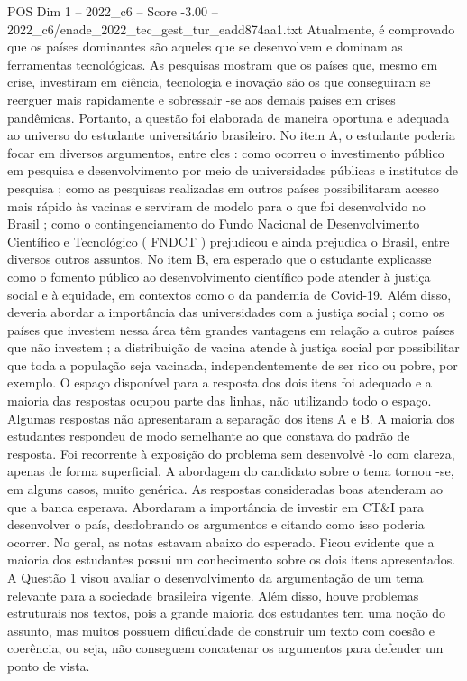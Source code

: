 \begin{textsample}{POS Dim 1 – 2022\_c6 – Score -3.00 – 2022\_c6/enade\_2022\_tec\_gest\_tur\_eadd874aa1.txt}
Atualmente, é comprovado que os países dominantes são aqueles que se desenvolvem e dominam as ferramentas tecnológicas.
As pesquisas mostram que os países que, mesmo em crise, investiram em ciência, tecnologia e inovação são os que conseguiram se reerguer mais rapidamente e sobressair -se aos demais países em crises pandêmicas.
Portanto, a questão foi elaborada de maneira oportuna e adequada ao universo do estudante universitário brasileiro.
No item A, o estudante poderia focar em diversos argumentos, entre eles : como ocorreu o investimento público em pesquisa e desenvolvimento por meio de universidades públicas e institutos de pesquisa ; como as pesquisas realizadas em outros países possibilitaram acesso mais rápido às vacinas e serviram de modelo para o que foi desenvolvido no Brasil ; como o contingenciamento do Fundo Nacional de Desenvolvimento Científico e Tecnológico ( FNDCT ) prejudicou e ainda prejudica o Brasil, entre diversos outros assuntos.
No item B, era esperado que o estudante explicasse como o fomento público ao desenvolvimento científico pode atender à justiça social e à equidade, em contextos como o da pandemia de Covid-19.
Além disso, deveria abordar a importância das universidades com a justiça social ; como os países que investem nessa área têm grandes vantagens em relação a outros países que não investem ; a distribuição de vacina atende à justiça social por possibilitar que toda a população seja vacinada, independentemente de ser rico ou pobre, por exemplo.
O espaço disponível para a resposta dos dois itens foi adequado e a maioria das respostas ocupou parte das linhas, não utilizando todo o espaço.
Algumas respostas não apresentaram a separação dos itens A e B.
A maioria dos estudantes respondeu de modo semelhante ao que constava do padrão de resposta.
Foi recorrente à exposição do problema sem desenvolvê -lo com clareza, apenas de forma superficial.
A abordagem do candidato sobre o tema tornou -se, em alguns casos, muito genérica.
As respostas consideradas boas atenderam ao que a banca esperava.
Abordaram a importância de investir em CT\&I para desenvolver o país, desdobrando os argumentos e citando como isso poderia ocorrer.
No geral, as notas estavam abaixo do esperado.
Ficou evidente que a maioria dos estudantes possui um conhecimento sobre os dois itens apresentados.
A Questão 1 visou avaliar o desenvolvimento da argumentação de um tema relevante para a sociedade brasileira vigente.
Além disso, houve problemas estruturais nos textos, pois a grande maioria dos estudantes tem uma noção do assunto, mas muitos possuem dificuldade de construir um texto com coesão e coerência, ou seja, não conseguem concatenar os argumentos para defender um ponto de vista.

\end{textsample}
